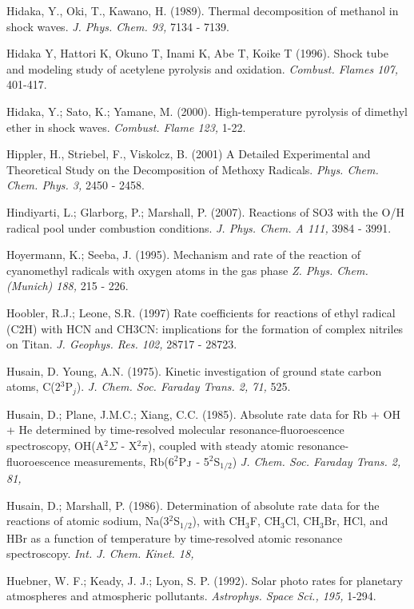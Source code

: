 \documentclass[12pt,landscape]{article}
\newcounter{reaction}
\newcounter{photo}
\begin{document}
Hidaka, Y., Oki, T., Kawano, H. (1989).  Thermal decomposition of methanol in shock waves.  {\em J. Phys. Chem. 93,} 7134 - 7139.

Hidaka Y, Hattori K, Okuno T, Inami K, Abe T, Koike T (1996).  Shock tube and modeling study of acetylene pyrolysis and oxidation.  {\em Combust. Flames 107,} 401-417.

Hidaka, Y.; Sato, K.; Yamane, M. (2000).  High-temperature pyrolysis of dimethyl ether in shock waves. {\em Combust. Flame 123,} 1-22.

Hippler, H., Striebel, F., Viskolcz, B. (2001) A Detailed Experimental and Theoretical Study on the Decomposition of Methoxy Radicals.  {\em Phys. Chem. Chem. Phys.  3,} 2450 - 2458.

Hindiyarti, L.; Glarborg, P.; Marshall, P. (2007).  Reactions of SO3 with the O/H radical pool under combustion conditions. {\em  J. Phys. Chem. A 111,} 3984 - 3991.

Hoyermann, K.; Seeba, J. (1995).
 Mechanism and rate of the reaction of cyanomethyl radicals with oxygen atoms in the gas phase
{\em Z. Phys. Chem. (Munich) 188,} 215 - 226.

Hoobler, R.J.; Leone, S.R. (1997)
Rate coefficients for reactions of ethyl radical (C2H) with HCN and CH3CN: implications for the formation of complex nitriles on Titan.
{\em J. Geophys. Res. 102,} 28717 - 28723. 

Husain, D. Young, A.N. (1975). Kinetic investigation of ground state carbon atoms, C(2$^3$P$_j$).  {\em J. Chem. Soc. Faraday Trans. 2, 71,} 525.

Husain, D.; Plane, J.M.C.; Xiang, C.C. (1985).  Absolute rate data for Rb + OH + He determined by time-resolved molecular resonance-fluoroescence spectroscopy, OH(A$^2\Sigma$ - X$^2\pi$), coupled with steady atomic resonance-fluoroescence measurements, Rb(6$^2$P$_{\rm J}$ - 5$^2$S$_{1/2}$) {\em J. Chem. Soc. Faraday Trans. 2, 81,}

Husain, D.; Marshall, P. (1986). Determination of absolute rate data for the reactions of atomic sodium, Na(3$^2$S$_{1/2}$), with CH$_3$F, CH$_3$Cl, CH$_3$Br, HCl, and HBr as a function of temperature by time-resolved atomic resonance spectroscopy. {\em Int. J. Chem. Kinet. 18,}

Huebner, W. F.; Keady, J. J.; Lyon, S. P. (1992). Solar photo rates for planetary atmospheres and atmospheric pollutants.  {\em Astrophys. Space Sci., 195,} 1-294.
\end{document}
